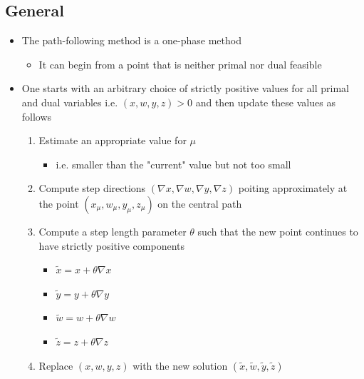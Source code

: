 \documentclass[11pt]{article}
\begin{document}
\subsection{General}
\label{sec:org9b78bfa}
\begin{itemize}
\item The path-following method is a one-phase method
\begin{itemize}
\item It can begin from a point that is neither primal nor dual feasible
\end{itemize}

\item One starts with an arbitrary choice of strictly positive values for all primal and dual variables i.e. \((x,w,y,z) >0\) and then update these values as follows
\begin{enumerate}
\item Estimate an appropriate value for \(\mu\)
\begin{itemize}
\item i.e. smaller than the "current" value but not too small
\end{itemize}
\item Compute step directions \((\nabla x, \nabla w, \nabla y, \nabla z)\) poiting approximately at the point \((x_\mu, w_\mu, y_\mu, z_\mu)\) on the central path
\item Compute a step length parameter \(\theta\) such that the new point continues to have strictly positive components
\begin{itemize}
\item \(\tilde x= x + \theta \nabla x\)
\item \(\tilde y= y + \theta \nabla y\)
\item \(\tilde w= w + \theta \nabla w\)
\item \(\tilde z= z + \theta \nabla z\)
\end{itemize}
\item Replace \((x,w,y,z)\) with the new solution \((\tilde x,\tilde w,\tilde y,\tilde z)\)
\end{enumerate}
\end{itemize}
\end{document}

